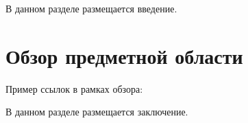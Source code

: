 \documentclass[times,specification,annotation]{itmo-student-thesis}
\begin{document}


\tableofcontents

\startprefacepage

В данном разделе размещается введение.



\chapter{Обзор предметной области}

\startrelatedwork

Пример ссылок в рамках обзора: 
\finishrelatedwork










\chapterconclusion


\startconclusionpage

В данном разделе размещается заключение.

\printmainbibliography
\end{document}
